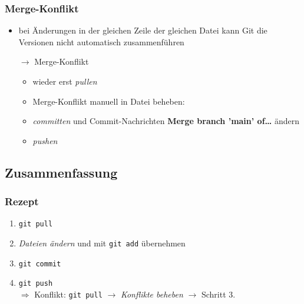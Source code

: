 \documentclass[
	ngerman, %
	aspectratio=169, %
	color={accentcolor=8b},
	colorframetitle=true,%
	authorontitle=true
]{tudabeamer}
\begin{document}
			\begin{frame}
				\frametitle{Merge-Konflikt}
					\begin{itemize}
						\item bei Änderungen in der gleichen Zeile der gleichen Datei kann Git die Versionen nicht automatisch zusammenführen
						\item[$\rightarrow$] Merge-Konflikt
						\begin{itemize}
							\item wieder erst \textit{pullen}
							\item Merge-Konflikt manuell in Datei beheben:\\
							
							\item \textit{committen} und Commit-Nachrichten \textbf{Merge branch 'main' of\dots} ändern
							\item \textit{pushen}
						\end{itemize}
					\end{itemize}
				
			\end{frame}
			
		
	\subsection{Zusammenfassung}
		\begin{frame}
		\frametitle{Rezept}
			\begin{enumerate}
				\item \texttt{git pull}
				\item \textit{Dateien ändern} und mit \texttt{git add} übernehmen
				\item \texttt{git commit}
				\item \texttt{git push}\\
				$\Rightarrow$ Konflikt: \texttt{git pull} $\rightarrow$ \textit{Konflikte beheben} $\rightarrow$ Schritt 3.
				
			\end{enumerate}
		\end{frame}
	
\end{document}
